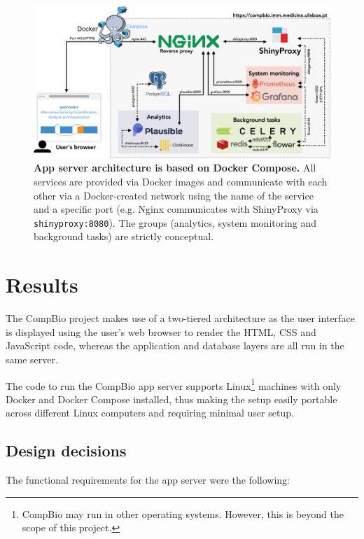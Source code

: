 \begin{figure}[!t]
  \includegraphics[width=.9\textwidth]{images/app-server/architecture}
  \centering
  \caption[App server architecture]{\textbf{App server architecture is based on Docker Compose.} All services are provided via Docker images and communicate with each other via a Docker-created network using the name of the service and a specific port (e.g. Nginx communicates with ShinyProxy via \texttt{shinyproxy:8080}). The groups  (analytics, system monitoring and background tasks) are strictly conceptual.}
  \label{fig:architecture}
\end{figure}

\section{Results}

The CompBio project makes use of a two-tiered architecture as the user interface is displayed using the user's web browser to render the HTML, CSS and JavaScript code, whereas the application and database layers are all run in the same server. %

The code to run the CompBio app server supports Linux\footnote{CompBio may run in other operating systems. However, this is beyond the scope of this project.} machines with only Docker and Docker Compose installed, thus making the setup easily portable across different Linux computers and requiring minimal user setup.

\subsection{Design decisions}

The functional requirements for the app server were the following:

